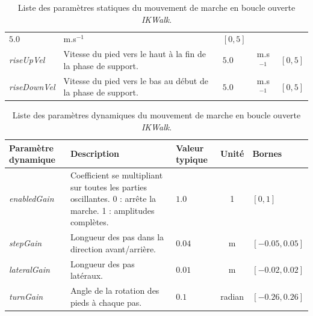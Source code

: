 \begin{table}[htbp]
\begin{center}
\begin{tabular}{|p{3.5cm}|p{6cm}|p{1.5cm}|c|l|}
            $5.0$ & m.s$^{-1}$ & $[0,5]$\\
        \textit{riseUpVel} & 
            Vitesse du pied vers le haut à la fin de la phase de support. & 
            $5.0$ & m.s$^{-1}$ & $[0,5]$\\
        \textit{riseDownVel} & 
            Vitesse du pied vers le bas au début de la phase de support. & 
            $5.0$ & m.s$^{-1}$ & $[0,5]$\\
        \hline
    \end{tabular}
    \caption{\label{tab:walk_params_static}Liste des paramètres statiques 
    du mouvement de marche en boucle ouverte \textit{IKWalk}.}
\end{center}
\end{table}
\begin{table}[htb!]
\begin{center}
    \begin{tabular}{|l|p{5cm}|p{1.5cm}|c|l|}
        \hline
        Paramètre dynamique & Description & Valeur typique & Unité & Bornes\\
        \hline
        \textit{enabledGain} & 
            Coefficient se multipliant sur toutes les parties oscillantes.
            0 : arrête la marche. 1 : amplitudes complètes. & 
            $1.0$ & 1 & $[0,1]$\\
        \textit{stepGain} & 
            Longueur des pas dans la direction avant/arrière. &
            $0.04$ & m & $[-0.05,0.05]$\\
        \textit{lateralGain} & 
            Longueur des pas latéraux. & 
            $0.01$ & m & $[-0.02,0.02]$\\
        \textit{turnGain} & 
            Angle de la rotation des pieds à chaque pas. & 
            $0.1$ & radian & $[-0.26,0.26]$\\
        \hline
    \end{tabular}
    \caption{\label{tab:walk_params_dynamic}Liste des paramètres dynamiques 
    du mouvement de marche en boucle ouverte \textit{IKWalk}.}
\end{center}
\end{table}

